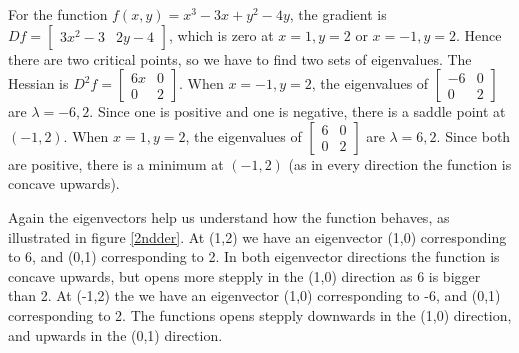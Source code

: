 \begin{example}
For the function {$f(x,y)=x^3-3x+y^2-4y$}, the gradient is $Df = \begin{bmatrix}3x^2-3&2y-4 \end{bmatrix}$, which is zero at $x=1,y=2$ or $x=-1,y=2$. Hence there are two critical points, so we have to find two sets of eigenvalues. The Hessian is $D^2f = \begin{bmatrix}6x&0 \\0&2\end{bmatrix}$. When $x=-1,y=2$, the eigenvalues of $\begin{bmatrix}-6&0 \\0&2\end{bmatrix}$ are $\lambda=-6,2$. Since one is positive and one is negative, there is a saddle point at $(-1,2)$. When $x=1,y=2$, the eigenvalues of $\begin{bmatrix}6&0 \\0&2\end{bmatrix}$ are $\lambda=6,2$. Since both are positive, there is a minimum at $(-1,2)$ (as in every direction the function is concave upwards).

Again the eigenvectors help us understand how the function behaves, as illustrated in figure \ref{2ndder}.  At (1,2) we have an eigenvector (1,0) corresponding to 6, and (0,1) corresponding to 2. In both eigenvector directions the function is concave upwards, but opens more stepply in the (1,0) direction as 6 is bigger than 2.  At (-1,2) the we have an eigenvector (1,0) corresponding to -6, and (0,1) corresponding to 2. The functions opens stepply downwards in the (1,0) direction, and upwards in the (0,1) direction. 
\end{example}









